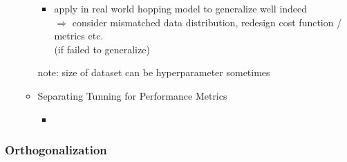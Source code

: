 \begin{itemize}
\begin{itemize}
\begin{itemize}
		\item apply in real world hopping model to generalize well indeed \\
		$\Rightarrow$ consider mismatched data distribution, redesign cost function / metrics etc. \\
		(if failed to generalize)
		\end{itemize}
		note: size of dataset can be hyperparameter sometimes
	\item Separating Tunning for Performance Metrics
		\begin{itemize}
		\item 
		\end{itemize}
	\end{itemize}
\end{itemize}

\subsubsection{Orthogonalization}
